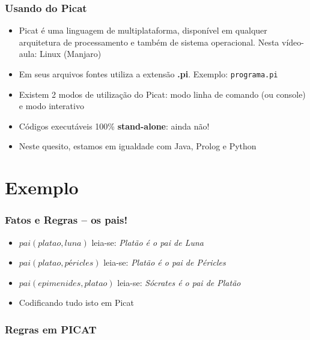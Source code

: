 \begin{frame}
    \frametitle{Usando do Picat}
    \begin{itemize}
     \item Picat é uma linguagem de multiplataforma, disponível em qualquer arquitetura de processamento e também de sistema operacional. Nesta vídeo-aula: Linux (Manjaro)
     \item Em seus arquivos fontes utiliza a extensão \textbf{.pi}. Exemplo: \texttt{programa.pi}
     \item Existem 2 modos de utilização do Picat: modo linha de comando (ou console) e modo interativo
     \item Códigos executáveis 100\% \textbf{stand-alone}: ainda não!
     \item Neste quesito, estamos em igualdade com Java, Prolog e Python
     
    \end{itemize}
\end{frame}


\section{Exemplo}
\begin{frame}
    \frametitle{Fatos e Regras -- os pais!}
    \begin{itemize}
    
    \item $pai(platao, luna)$ \hspace{1.5cm} leia-se: \textit{Platão é o pai de Luna}
    \item $pai(platao, péricles)$ \hspace{1.5cm} leia-se: \textit{Platão é o pai de Péricles}
    \item $pai(epimenides, platao)$ \hspace{1.5cm} leia-se: \textit{Sócrates é o pai de Platão}
    \item Codificando tudo isto  em Picat
    \end{itemize}
\end{frame}

\begin{frame}[allowframebreaks=0.9]
 \frametitle{Regras em PICAT}



\end{frame}


